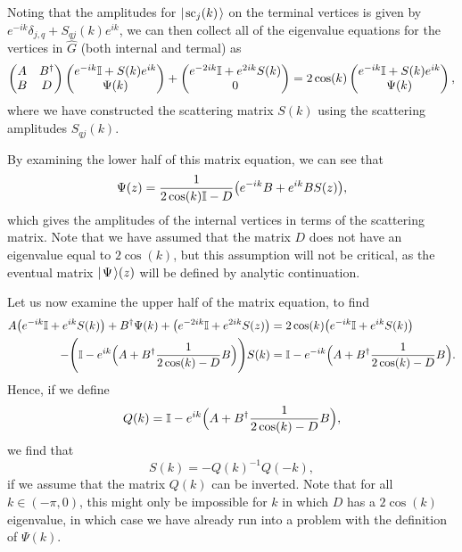 \documentclass[../thesis-main/thesis-main]{subfiles}
\begin{document}
Noting that the amplitudes for $|\mspace{2mu} \text{sc}_j(k) \mspace{2mu} \rangle$ on the terminal vertices is given by $ e^{-i k}\delta_{j,q} + S_{qj}(k)e^{ik}$, we can then collect all of the eigenvalue equations for the vertices in $\widehat{G}$ (both internal and termal) as
\begin{equation}
  \begin{pmatrix} A & B^\dag \\
    B & D\end{pmatrix} \begin{pmatrix}  e^{-i k} \mathbb{I} + S(k) e^{i k}\\ \Psi(k)\end{pmatrix} 
    + \begin{pmatrix} e^{-2 i k} \mathbb{I} + e^{2 i k} S(k)\\ 0\end{pmatrix} = 
    2 \cos(k) \begin{pmatrix}  e^{-i k} \mathbb{I} + S(k) e^{i k}\\ \Psi(k)\end{pmatrix},
\end{equation}
where we have constructed the scattering matrix $S(k)$ using the scattering amplitudes $S_{qj}(k)$.

By examining the lower half of this matrix equation, we can see that
\begin{equation}
  \Psi(z) = \frac{1}{2 \cos(k) \mathbb{I} - D} \big( e^{-ik} B + e^{i k} B S(z)\big),
\end{equation}
which gives the amplitudes of the internal vertices in terms of the scattering matrix.  Note that we have assumed that the matrix $D$ does not have an eigenvalue equal to $2\cos(k)$, but this assumption will not be critical, as the eventual matrix $|\mspace{2mu} \Psi \mspace{2mu} \rangle(z)$ will be defined by analytic continuation.

Let us now examine the upper half of the matrix equation, to find
\begin{align}
  A\big(e^{-ik} \mathbb{I}+ e^{i k} S(k)\big) + B^\dag \Psi(k) + \big(e^{-2 ik}\mathbb{I} + e^{2 i k} S(z)\big) &= 2 \cos(k) \big(e^{-ik} \mathbb{I} + e^{i k} S(k)\big)\\
  -\Bigg(\mathbb{I} - e^{ik}\Big(A + B^\dag \frac{1}{2 \cos(k) - D} B\Big)\Bigg)S(k) &= \mathbb{I} - e^{-ik}\Big(A + B^\dag \frac{1}{2 \cos(k) - D} B\Big).
\end{align}
Hence, if we define
\begin{equation}
  Q(k) = \mathbb{I} - e^{ik}\Big( A + B^\dag \frac{1}{2 \cos(k) - D} B\Big),
\end{equation}
we find that
\begin{equation}
  S(k) = - Q(k)^{-1} Q(-k),
\end{equation}
if we assume that the matrix $Q(k)$ can be inverted.  Note that for all ${k\in (-\pi,0)}$, this might only be impossible for $k$ in which $D$ has a $2\cos(k)$ eigenvalue, in which case we have already run into a problem with the definition of $\Psi(k)$.
\end{document}
